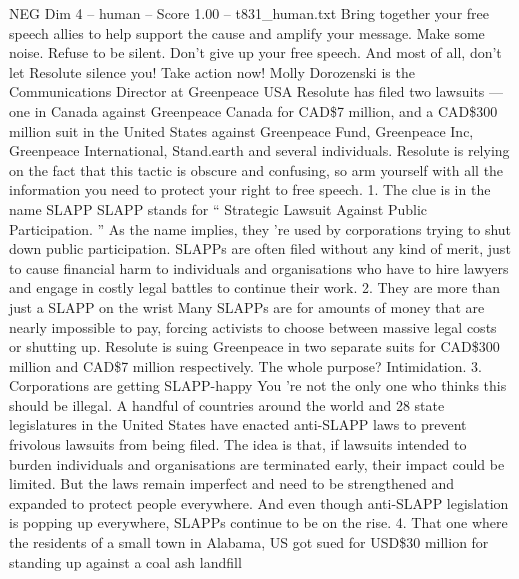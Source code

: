 \begin{textsample}{NEG Dim 4 – human – Score 1.00 – t831\_human.txt}
Bring together your free speech allies to help support the cause and amplify your message.
Make some noise.
Refuse to be silent.
Don't give up your free speech.
And most of all, don't let Resolute silence you!
Take action now!
Molly Dorozenski is the Communications Director at Greenpeace USA Resolute has filed two lawsuits — one in Canada against Greenpeace Canada for CAD\$7 million, and a CAD\$300 million suit in the United States against Greenpeace Fund, Greenpeace Inc, Greenpeace International, Stand.earth and several individuals.
Resolute is relying on the fact that this tactic is obscure and confusing, so arm yourself with all the information you need to protect your right to free speech. 1.
The clue is in the name SLAPP SLAPP stands for “ Strategic Lawsuit Against Public Participation. ” As the name implies, they ’re used by corporations trying to shut down public participation.
SLAPPs are often filed without any kind of merit, just to cause financial harm to individuals and organisations who have to hire lawyers and engage in costly legal battles to continue their work. 2.
They are more than just a SLAPP on the wrist Many SLAPPs are for amounts of money that are nearly impossible to pay, forcing activists to choose between massive legal costs or shutting up.
Resolute is suing Greenpeace in two separate suits for CAD\$300 million and CAD\$7 million respectively.
The whole purpose?
Intimidation. 3.
Corporations are getting SLAPP-happy You ’re not the only one who thinks this should be illegal.
A handful of countries around the world and 28 state legislatures in the United States have enacted anti-SLAPP laws to prevent frivolous lawsuits from being filed.
The idea is that, if lawsuits intended to burden individuals and organisations are terminated early, their impact could be limited.
But the laws remain imperfect and need to be strengthened and expanded to protect people everywhere.
And even though anti-SLAPP legislation is popping up everywhere, SLAPPs continue to be on the rise. 4.
That one where the residents of a small town in Alabama, US got sued for USD\$30 million for standing up against a coal ash landfill

\end{textsample}
